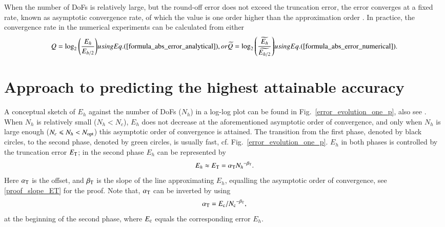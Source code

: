\documentclass[review,3p]{elsarticle}
\begin{document}
When the number of DoFs is relatively large, but the round-off error does not exceed the truncation error, the error converges at a fixed rate, known as asymptotic convergence rate, of which the value is one order higher than the approximation order \cite{gockenbach2006understanding}. In practice, the convergence rate in the numerical experiments can be calculated from either 
\begin{subequations}	\label{formula_order_of_convergence_block}
\begin{align}
 Q=\log _2 \left( \frac{E_{h}}{E_{h/2}} \right)
 \label{formula_order_of_convergence_analytical_solution}
\end{align}
using Eq. (\ref{formula_abs_error_analytical}), or
\begin{align}
 \widetilde{Q}=\log _2 \left( \frac{\widetilde {E_{h}}}{\widetilde {E_{h/2}}} \right)		\label{formula_order_of_convergence_finer_solution}
\end{align}
using Eq. (\ref{formula_abs_error_numerical}).
\end{subequations}


\section{Approach to predicting the highest attainable accuracy}      \label{section_error_evolution_and_prediction}

A conceptual sketch of $E_h$ against the number of DoFs ($N_h$) in a log-log plot can be found in Fig.~\ref{error_evolution_one_p}, also see \cite{butcher2016numerical}.
When $N_h$ is relatively small ($N_h<N_c$), $E_h$ does not decrease at the aforementioned asymptotic order of convergence, and only when $N_h$ is large enough ($N_c \leqslant N_h < N_{\rm opt}$) this asymptotic order of convergence is attained.  The transition from the first phase, denoted by black circles, to the second phase, denoted by green circles, is usually fast, cf. Fig.~\ref{error_evolution_one_p}. $E_h$ in both phases is controlled by the truncation error $E_{\rm T}$; in the second phase $E_h$ can be represented by 
\begin{equation}
 E_{h} \approx E_{\rm T} = \alpha_{\rm T}{N_{h}}^{-\beta_{\rm T}}.		\label{formula_truncation_error}
\end{equation}
Here $\alpha_{\rm T}$ is the offset, and $\beta_{\rm T}$ is the slope of the line approximating $E_h$, equalling the asymptotic order of convergence, see \ref{proof_slope_ET} for the proof. Note that, $\alpha_{\rm T}$ can be inverted by using 
\begin{equation}
 \alpha_{\rm T} = {E_{\rm c}}/{N_{\rm c}}^{- \beta_{\rm T}},		\label{formula_offset_truncation_error}
\end{equation}
at the beginning of the second phase, where $E_{\rm c}$ equals the corresponding error $E_h$.
\end{document}
